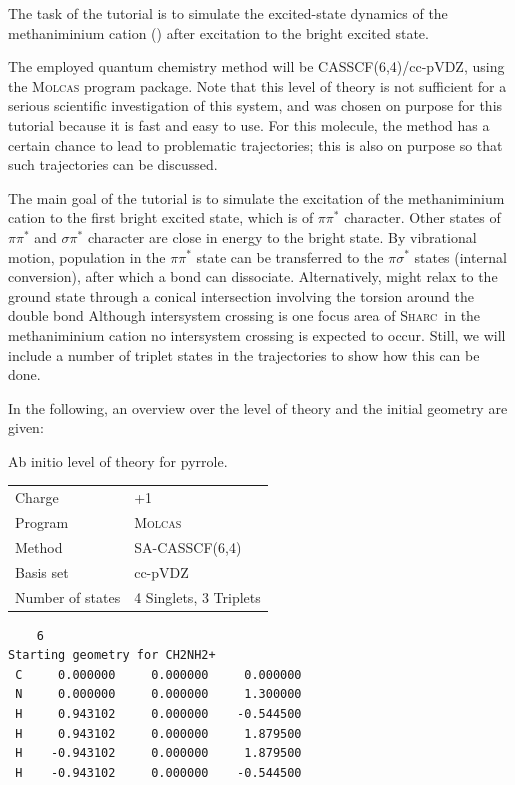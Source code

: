 \documentclass[a4paper,11pt,DIV=15,openany]{scrbook}
\newcommand{\sharc}{\textsc{Sharc}}
\newenvironment{example}{
  \vspace{0mm}
  \definecolor{shadecolor}{HTML}{E4F4FF}
  \begin{shaded}
}{
  \end{shaded}
}
\begin{document}
The task of the tutorial is to simulate the excited-state dynamics of the methaniminium cation () after excitation to the bright excited state.

The employed quantum chemistry method will be CASSCF(6,4)/cc-pVDZ, using the \textsc{Molcas} program package. 
Note that this level of theory is not sufficient for a serious scientific investigation of this system, and was chosen on purpose for this tutorial because it is fast and easy to use.
For this molecule, the method has a certain chance to lead to problematic trajectories; this is also on purpose so that such trajectories can be discussed.

The main goal of the tutorial is to simulate the excitation of the methaniminium cation to the first bright excited state, which is of $\pi\pi^*$ character.
Other states of $\pi\pi^*$ and $\sigma\pi^*$ character are close in energy to the bright state. 
By vibrational motion, population in the $\pi\pi^*$ state can be transferred to the $\pi\sigma^*$ states (internal conversion), after which a bond can dissociate.
Alternatively,  might relax to the ground state through a conical intersection involving the torsion around the double bond
Although intersystem crossing is one focus area of \sharc\, in the methaniminium cation no intersystem crossing is expected to occur. Still, we will include a number of triplet states in the trajectories to show how this can be done.

In the following, an overview over the level of theory and the initial geometry are given:

\begin{example}
\begin{minipage}[t]{0.45\textwidth}
  \centering
  Ab initio level of theory for pyrrole.
  \begin{tabular}{ll}
    \toprule
    Charge              &+1\\
    Program             &\textsc{Molcas}\\
    Method              &SA-CASSCF(6,4)\\
    Basis set           &cc-pVDZ\\
    Number of states    &4 Singlets, 3 Triplets\\
    \bottomrule
  \end{tabular}
\end{minipage}
\hfill
\begin{minipage}[t]{0.45\textwidth}
  \begin{verbatim}
    6
Starting geometry for CH2NH2+
 C     0.000000     0.000000     0.000000
 N     0.000000     0.000000     1.300000
 H     0.943102     0.000000    -0.544500
 H     0.943102     0.000000     1.879500
 H    -0.943102     0.000000     1.879500
 H    -0.943102     0.000000    -0.544500
  \end{verbatim}
\end{minipage}
\end{example}
\end{document}
